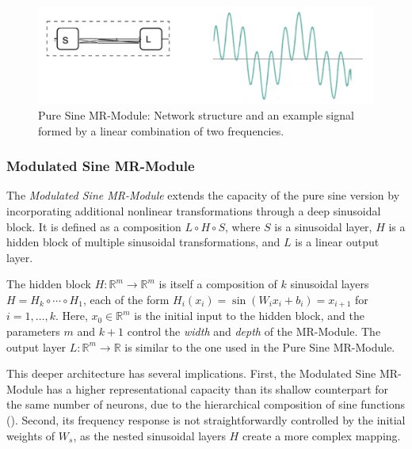 \begin{figure}[!h]
\centering
\includegraphics[width=0.8\linewidth]{img/ch4/pure-sine.png}
\caption{Pure Sine MR-Module: Network structure and an example signal formed by a linear combination of two frequencies.}
\label{f:pure-sine}
\end{figure}

\subsubsection{Modulated Sine MR-Module}

The \textit{Modulated Sine MR-Module} extends the capacity of the pure sine version by incorporating additional nonlinear transformations through a deep sinusoidal block. It is defined as a composition \( L \circ H \circ S \), where \( S \) is a sinusoidal layer, \( H \) is a hidden block of multiple sinusoidal transformations, and \( L \) is a linear output layer.

The hidden block \( H\!:\!\mathbb{R}^m\!\to\! \mathbb{R}^m \) is itself a composition of \( k \) sinusoidal layers \( H = H_k \circ \cdots \circ H_1 \), each of the form \( H_i(x_i) = \sin\left(W_i x_i + b_i\right) = x_{i+1} \) for \( i = 1, \dots, k \). Here, \( x_0 \in \mathbb{R}^m \) is the initial input to the hidden block, and the parameters \( m \) and \( k + 1 \) control the \textit{width} and \textit{depth} of the MR-Module. The output layer \( L \!:\! \mathbb{R}^m \!\to\! \mathbb{R} \) is similar to the one used in the Pure Sine MR-Module.

This deeper architecture has several implications. First, the Modulated Sine MR-Module has a higher representational capacity than its shallow counterpart for the same number of neurons, due to the hierarchical composition of sine functions (\cite{novello2022understanding}). Second, its frequency response is not straightforwardly controlled by the initial weights of \( W_s \), as the nested sinusoidal layers \( H \) create a more complex mapping. 

